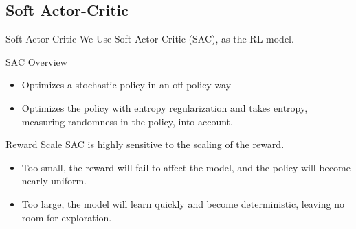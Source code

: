 \subsection{Soft Actor-Critic}



\begin{frame}{Soft Actor-Critic}
We Use Soft Actor-Critic (SAC), as the RL model.
\begin{block}{SAC Overview}
\begin{itemize}
    \item Optimizes a stochastic policy in an off-policy way
    \item Optimizes the policy with \alert{entropy regularization} and takes entropy, measuring randomness in the policy, into account.
\end{itemize}
\end{block}
\begin{alertblock}{Reward Scale}
SAC is highly sensitive to the scaling of the reward. 
\begin{itemize}
    \item Too small, the reward will fail to affect the model, and the policy will become nearly uniform.
    \item Too large, the model will learn quickly and become deterministic, leaving no room for exploration.
\end{itemize}
\end{alertblock}
\end{frame}
